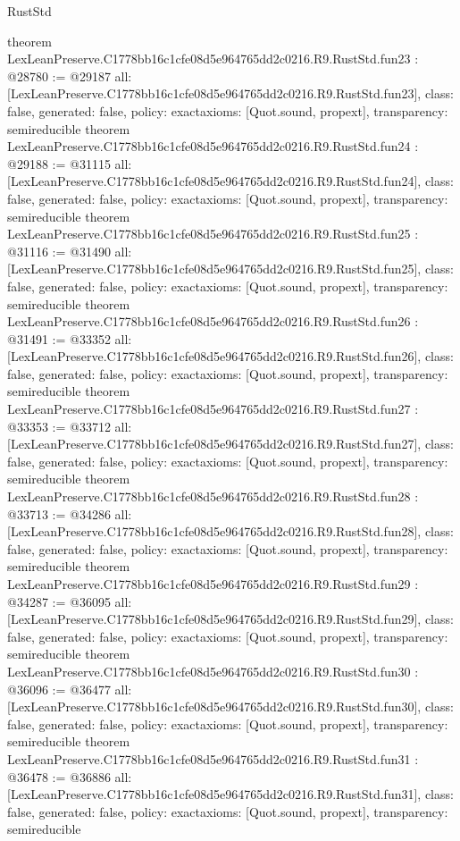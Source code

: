 \begin{lexlean}{RustStd}
\begin{coremodule}
{}
theorem LexLeanPreserve.C1778bb16c1cfe08d5e964765dd2c0216.R9.RustStd.fun23 : @28780 := @29187 {
  all: [LexLeanPreserve.C1778bb16c1cfe08d5e964765dd2c0216.R9.RustStd.fun23],
  class: false,
  generated: false,
  policy: exact{axioms: [Quot.sound, propext]},
  transparency: semireducible
}
theorem LexLeanPreserve.C1778bb16c1cfe08d5e964765dd2c0216.R9.RustStd.fun24 : @29188 := @31115 {
  all: [LexLeanPreserve.C1778bb16c1cfe08d5e964765dd2c0216.R9.RustStd.fun24],
  class: false,
  generated: false,
  policy: exact{axioms: [Quot.sound, propext]},
  transparency: semireducible
}
theorem LexLeanPreserve.C1778bb16c1cfe08d5e964765dd2c0216.R9.RustStd.fun25 : @31116 := @31490 {
  all: [LexLeanPreserve.C1778bb16c1cfe08d5e964765dd2c0216.R9.RustStd.fun25],
  class: false,
  generated: false,
  policy: exact{axioms: [Quot.sound, propext]},
  transparency: semireducible
}
theorem LexLeanPreserve.C1778bb16c1cfe08d5e964765dd2c0216.R9.RustStd.fun26 : @31491 := @33352 {
  all: [LexLeanPreserve.C1778bb16c1cfe08d5e964765dd2c0216.R9.RustStd.fun26],
  class: false,
  generated: false,
  policy: exact{axioms: [Quot.sound, propext]},
  transparency: semireducible
}
theorem LexLeanPreserve.C1778bb16c1cfe08d5e964765dd2c0216.R9.RustStd.fun27 : @33353 := @33712 {
  all: [LexLeanPreserve.C1778bb16c1cfe08d5e964765dd2c0216.R9.RustStd.fun27],
  class: false,
  generated: false,
  policy: exact{axioms: [Quot.sound, propext]},
  transparency: semireducible
}
theorem LexLeanPreserve.C1778bb16c1cfe08d5e964765dd2c0216.R9.RustStd.fun28 : @33713 := @34286 {
  all: [LexLeanPreserve.C1778bb16c1cfe08d5e964765dd2c0216.R9.RustStd.fun28],
  class: false,
  generated: false,
  policy: exact{axioms: [Quot.sound, propext]},
  transparency: semireducible
}
theorem LexLeanPreserve.C1778bb16c1cfe08d5e964765dd2c0216.R9.RustStd.fun29 : @34287 := @36095 {
  all: [LexLeanPreserve.C1778bb16c1cfe08d5e964765dd2c0216.R9.RustStd.fun29],
  class: false,
  generated: false,
  policy: exact{axioms: [Quot.sound, propext]},
  transparency: semireducible
}
theorem LexLeanPreserve.C1778bb16c1cfe08d5e964765dd2c0216.R9.RustStd.fun30 : @36096 := @36477 {
  all: [LexLeanPreserve.C1778bb16c1cfe08d5e964765dd2c0216.R9.RustStd.fun30],
  class: false,
  generated: false,
  policy: exact{axioms: [Quot.sound, propext]},
  transparency: semireducible
}
theorem LexLeanPreserve.C1778bb16c1cfe08d5e964765dd2c0216.R9.RustStd.fun31 : @36478 := @36886 {
  all: [LexLeanPreserve.C1778bb16c1cfe08d5e964765dd2c0216.R9.RustStd.fun31],
  class: false,
  generated: false,
  policy: exact{axioms: [Quot.sound, propext]},
  transparency: semireducible
}
\end{coremodule}
\end{lexlean}
